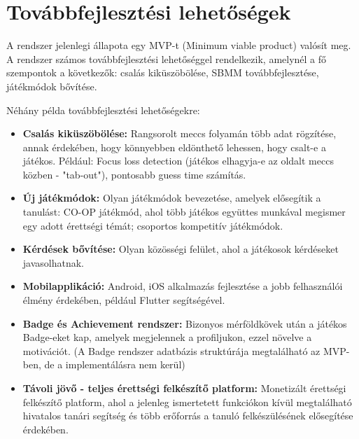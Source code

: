 \newpage

\section{Továbbfejlesztési lehetőségek}
A rendszer jelenlegi állapota egy MVP-t (Minimum viable product) valósít meg. A rendszer számos továbbfejlesztési lehetőséggel rendelkezik, amelynél a fő szempontok a következők: csalás kiküszöbölése, SBMM továbbfejlesztése, játékmódok bővítése.

Néhány példa továbbfejlesztési lehetőségekre:
\begin{itemize}
    \item \textbf{Csalás kiküszöbölése:} Rangsorolt meccs folyamán több adat rögzítése, annak érdekében, hogy könnyebben eldönthető lehessen, hogy csalt-e a játékos. Például: Focus loss detection (játékos elhagyja-e az oldalt meccs közben - "tab-out"), pontosabb guess time számítás.
    \item \textbf{Új játékmódok:} Olyan játékmódok bevezetése, amelyek elősegítik a tanulást: CO-OP játékmód, ahol több játékos együttes munkával megismer egy adott érettségi témát; csoportos kompetitív játékmódok.
    \item \textbf{Kérdések bővítése:} Olyan közösségi felület, ahol a játékosok kérdéseket javasolhatnak.
    \item \textbf{Mobilapplikáció:} Android, iOS alkalmazás fejlesztése a jobb felhasználói élmény érdekében, például Flutter segítségével.
    \item \textbf{Badge és Achievement rendszer:} Bizonyos mérföldkövek után a játékos Badge-eket kap, amelyek megjelennek a profiljukon, ezzel növelve a motivációt. (A Badge rendszer adatbázis struktúrája megtalálható az MVP-ben, de a implementálásra nem kerül)
    \item \textbf{Távoli jövő - teljes érettségi felkészítő platform:} Monetizált érettségi felkészítő platform, ahol a jelenleg ismertetett funkciókon kívül megtalálható hivatalos tanári segítség és több erőforrás a tanuló felkészülésének elősegítése érdekében.
\end{itemize}